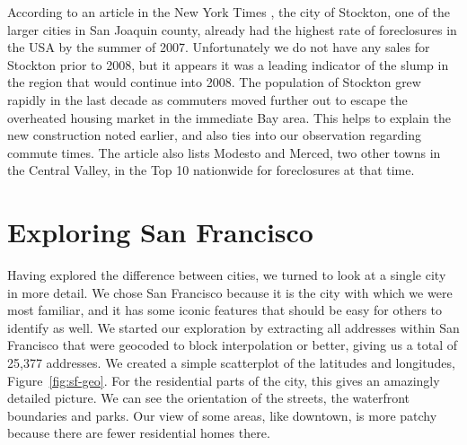\documentclass[oneside]{article}
\begin{document}
According to an article in the New York Times \citep{mckinley:2007}, the city of Stockton, one of the larger cities in San Joaquin county, already had the highest rate of foreclosures in the USA by the summer of 2007. Unfortunately we do not have any sales for Stockton prior to 2008, but it appears it was a leading indicator of the slump in the region that would continue into 2008. The population of Stockton grew rapidly in the last decade as commuters moved further out to escape the overheated housing market in the immediate Bay area. This helps to explain the new construction noted earlier, and also ties into our observation regarding commute times. The article also lists Modesto and Merced, two other towns in the Central Valley, in the Top 10 nationwide for foreclosures at that time.   


\section{Exploring San Francisco}

Having explored the difference between cities, we turned to look at a single city in more detail.  We chose San Francisco because it is the city with which we were most familiar, and it has some iconic features that should be easy for others to identify as well.  We started our exploration by extracting all addresses within San Francisco that were geocoded to block interpolation or better, giving us a total of 25,377 addresses.  We created a simple scatterplot of the latitudes and longitudes, Figure~\ref{fig:sf-geo}.  For the residential parts of the city, this gives an amazingly detailed picture.  We can see the orientation of the streets, the waterfront boundaries and parks.  Our view of some areas, like downtown, is more patchy because there are fewer residential homes there.
\end{document}
